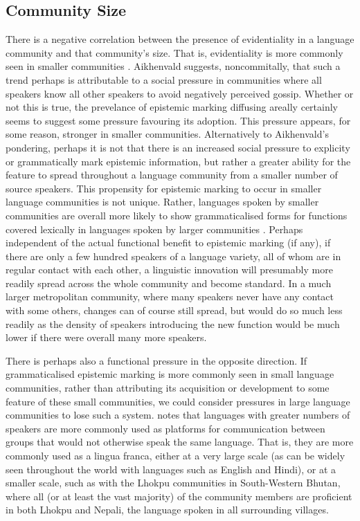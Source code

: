 \subsection{Community Size}\label{ss:History:CommunitySize}
There is a negative correlation between the presence of evidentiality in a language community and that community's size. That is, evidentiality is more commonly seen in smaller communities \cite[359]{Aikhenvald2004}. Aikhenvald suggests, noncommitally, that such a trend perhaps is attributable to a social pressure in communities where all speakers know all other speakers to avoid negatively perceived gossip. Whether or not this is true, the prevelance of epistemic marking diffusing areally certainly seems to suggest some pressure favouring its adoption. This pressure appears, for some reason, stronger in smaller communities. Alternatively to Aikhenvald's pondering, perhaps it is not that there is an increased social pressure to explicity or grammatically mark epistemic information, but rather a greater ability for the feature to spread throughout a language community from a smaller number of source speakers. This propensity for epistemic marking to occur in smaller language communities is not unique. Rather, languages spoken by smaller communities are overall more likely to show grammaticalised forms for functions covered lexically in languages spoken by larger communities \cite{Lupyan2010}. Perhaps independent of the actual functional benefit to epistemic marking (if any), if there are only a few hundred speakers of a language variety, all of whom are in regular contact with each other, a linguistic innovation will presumably more readily spread across the whole community and become standard. In a much larger metropolitan community, where many speakers never have any contact with some others, changes can of course still spread, but would do so much less readily as the density of speakers introducing the new function would be much lower if there were overall many more speakers.

There is perhaps also a functional pressure in the opposite direction. If grammaticalised epistemic marking is more commonly seen in small language communities, rather than attributing its acquisition or development to some feature of these small communities, we could consider pressures in large language communities to lose such a system.  notes that languages with greater numbers of speakers are more commonly used as platforms for communication between groups that would not otherwise speak the same language. That is, they are more commonly used as a lingua franca, either at a very large scale (as can be widely seen throughout the world with languages such as English and Hindi), or at a smaller scale, such as with the Lhokpu communities in South-Western Bhutan, where all (or at least the vast majority) of the community members are proficient in both Lhokpu and Nepali, the language spoken in all surrounding villages. 

